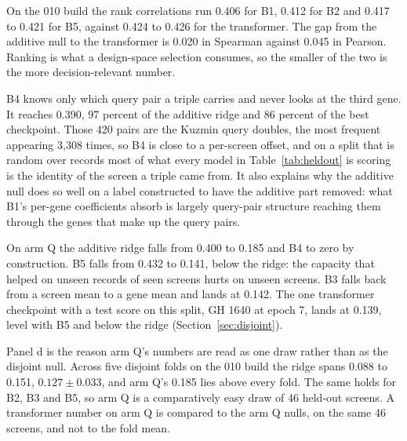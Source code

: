 On the 010 build the rank correlations run 0.406 for B1, 0.412 for B2 and 0.417 to
0.421 for B5, against 0.424 to 0.426 for the transformer. The gap from the additive
null to the transformer is 0.020 in Spearman against 0.045 in Pearson. Ranking is
what a design-space selection consumes, so the smaller of the two is the more
decision-relevant number.
\fi

B4 knows only which query pair a triple carries and never looks at the third gene.
It reaches 0.390, 97 percent of the additive ridge and 86 percent of the best
checkpoint. Those 420 pairs are the Kuzmin query doubles, the most frequent
appearing 3{,}308 times, so B4 is close to a per-screen offset, and on a split that
is random over records most of what every model in Table~\ref{tab:heldout} is
scoring is the identity of the screen a triple came from. It also explains why the
additive null does so well on a label constructed to have the additive part
removed: what B1's per-gene coefficients absorb is largely query-pair structure
reaching them through the genes that make up the query pairs.

On arm Q the additive ridge falls from 0.400 to 0.185 and B4 to zero by
construction. B5 falls from 0.432 to 0.141, below the ridge: the capacity that
helped on unseen records of seen screens hurts on unseen screens. B3 falls back from
a screen mean to a gene mean and lands at 0.142. The one transformer checkpoint
with a test score on this split, GH 1640 at epoch 7, lands at 0.139, level with B5
and below the ridge (Section~\ref{sec:disjoint}).

Panel d is the reason arm Q's numbers are read as one draw rather than as the
disjoint null. Across five disjoint folds on the 010 build the ridge spans 0.088 to
0.151, $0.127 \pm 0.033$, and arm Q's 0.185 lies above every fold. The same holds
for B2, B3 and B5, so arm Q is a comparatively easy draw of 46 held-out screens. A
transformer number on arm Q is compared to the arm Q nulls, on the same 46 screens,
and not to the fold mean.

